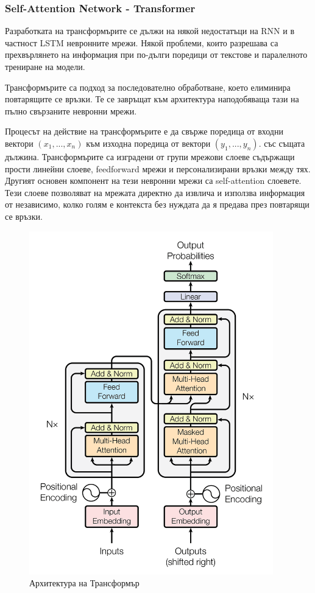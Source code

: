 \documentclass{article}
\begin{document}
\subsubsection{Self-Attention Network - Transformer}

Разработката на трансформърите се дължи на някой недостатъци на RNN и в частност LSTM невронните мрежи. Някой проблеми,
които разрешава са прехвърлянето на информация при по-дълги поредици от текстове и паралелното трениране на модели.

Трансформърите са подход за последователно обработване, което елиминира повтарящите се връзки. Те се завръщат към
архитектура наподобяваща тази на пълно свързаните невронни мрежи.

Процесът на действие на трансформърите е да свърже поредица от входни вектори $(x_1, ..., x_n)$ към изходна поредица от
вектори $(y_1, ..., y_n)$. със същата дължина. Трансформърите са изградени от групи мрежови слоеве съдържащи прости
линейни слоеве, feedforward мрежи и персонализирани връзки между тях. Другият основен компонент на тези невронни мрежи
са self-attention слоевете. Тези слоеве позволяват на мрежата директно да извлича и използва информация от независимо,
колко голям е контекста без нуждата да я предава през повтарящи се връзки.

\begin{figure}[H]
  \centering
  \captionsetup{justification=centering}
  \includegraphics[width=400px, keepaspectratio]{chapter-03/transformer.png}
  \caption{Архитектура на Трансформър}
\end{figure}
\end{document}
